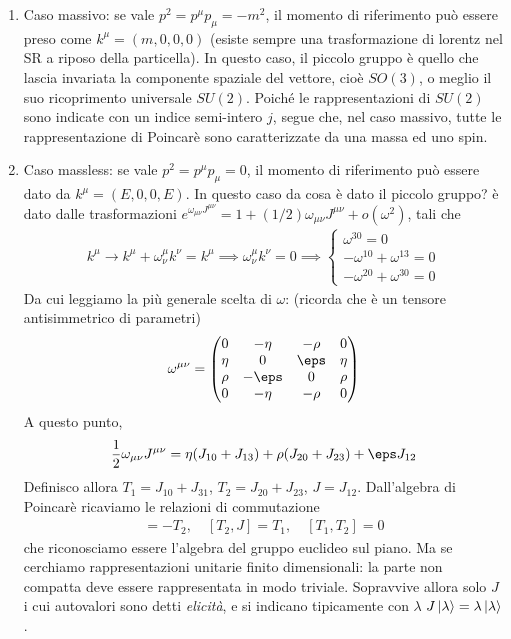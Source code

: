 \documentclass{report}
\begin{document}
\begin{enumerate}
    \item Caso massivo: se vale \(p^2 = p^\mu p_\mu = -m^2\), il momento di riferimento può essere preso come \(k^\mu = (m ,0, 0, 0)\) (esiste sempre una trasformazione di lorentz nel SR a riposo della particella). In questo caso, il piccolo gruppo è quello che lascia invariata la componente spaziale del vettore, cioè \(SO(3)\), o meglio il suo ricoprimento universale \(SU(2)\). Poiché le rappresentazioni di \(SU(2)\) sono indicate con un indice semi-intero \(j\), segue che, nel caso massivo, tutte le rappresentazione di Poincarè sono caratterizzate da una massa ed uno spin. 
    \item Caso massless: se vale \(p^2 = p^\mu p_\mu = 0\), il momento di riferimento può essere dato da \(k^\mu = (E, 0, 0, E)\). In questo caso da cosa è dato il piccolo gruppo? è dato dalle trasformazioni \(e^{\omega_{\mu\nu}J^{\mu\nu}} = 1 + (1/2)\omega_{\mu\nu}J^{\mu\nu} + o(\omega^2)\), tali che 
    \begin{align}
        k^\mu \to k^{\mu} + \omega^\mu_\nu k^\nu = k^\mu \implies \omega^\mu_\nu k^\nu = 0 \implies \begin{cases}
            \omega^{30} = 0 \\ -\omega^{10}+\omega^{13} = 0 \\ -\omega^{20} + \omega^{30} = 0 
        \end{cases}
    \end{align}
    Da cui leggiamo la più generale scelta di \(\omega\): (ricorda che è un tensore antisimmetrico di parametri) 
    \begin{align}
        \omega^{\mu\nu} = \begin{pmatrix}
            0 & -\eta & -\rho & 0 \\
            \eta & 0 & \eps & \eta \\ 
            \rho & -\eps & 0 & \rho \\ 
            0 & -\eta & -\rho & 0 
        \end{pmatrix}
    \end{align}
    A questo punto, 
    \begin{align}
        \frac{1}{2}\omega_{\mu\nu}J^{\mu\nu} = \eta (J_{10} + J_{13}) + \rho (J_{20} + J_{23}) + \eps J_{12}
    \end{align}
    Definisco allora \(T_1 = J_{10} + J_{31}\), \(T_2 = J_{20} + J_{23}\), \(J = J_{12}\). Dall'algebra di Poincarè ricaviamo le relazioni di commutazione 
    \begin{align}
        [T_1, J] = -T_2, \quad [T_2, J] = T_1, \quad [T_1, T_2] = 0 
    \end{align}
    che riconosciamo essere l'algebra del gruppo euclideo sul piano. Ma se cerchiamo rappresentazioni unitarie finito dimensionali: la parte non compatta deve essere rappresentata in modo triviale. Sopravvive allora solo \(J\) i cui autovalori sono detti \emph{elicità}, e si indicano tipicamente con \(\lambda\) \(J\ket{\lambda} = \lambda\ket{\lambda}\). 


\end{enumerate}
\end{document}
